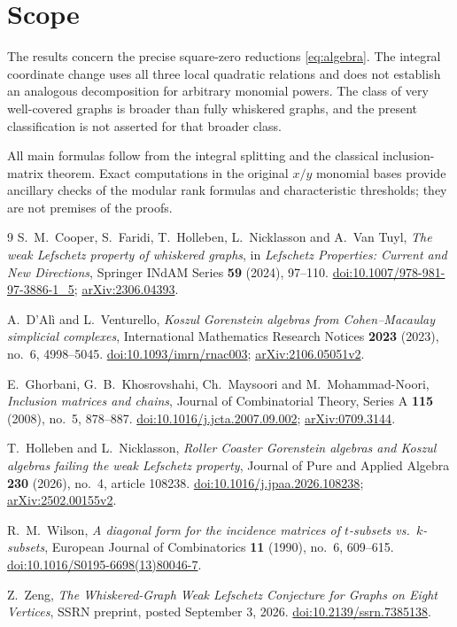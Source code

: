 \documentclass[11pt]{article}
\theoremstyle{remark}
\begin{document}
\section{Scope}
The results concern the precise square-zero reductions \eqref{eq:algebra}. The integral coordinate change uses all three local quadratic relations and does not establish an analogous decomposition for arbitrary monomial powers. The class of very well-covered graphs is broader than fully whiskered graphs, and the present classification is not asserted for that broader class.

All main formulas follow from the integral splitting and the classical inclusion-matrix theorem. Exact computations in the original $x/y$ monomial bases provide ancillary checks of the modular rank formulas and characteristic thresholds; they are not premises of the proofs.

\begin{thebibliography}{9}
S.~M.~Cooper, S.~Faridi, T.~Holleben, L.~Nicklasson and A.~Van Tuyl,
\emph{The weak Lefschetz property of whiskered graphs},
in \emph{Lefschetz Properties: Current and New Directions}, Springer INdAM Series \textbf{59} (2024), 97--110.
\href{https://doi.org/10.1007/978-981-97-3886-1_5}{doi:10.1007/978-981-97-3886-1\_5};
\href{https://arxiv.org/abs/2306.04393}{arXiv:2306.04393}.

A.~D'Al\`i and L.~Venturello,
\emph{Koszul Gorenstein algebras from Cohen--Macaulay simplicial complexes},
International Mathematics Research Notices \textbf{2023} (2023), no.~6, 4998--5045.
\href{https://doi.org/10.1093/imrn/rnac003}{doi:10.1093/imrn/rnac003};
\href{https://arxiv.org/abs/2106.05051v2}{arXiv:2106.05051v2}.

E.~Ghorbani, G.~B.~Khosrovshahi, Ch.~Maysoori and M.~Mohammad-Noori,
\emph{Inclusion matrices and chains},
Journal of Combinatorial Theory, Series A \textbf{115} (2008), no.~5, 878--887.
\href{https://doi.org/10.1016/j.jcta.2007.09.002}{doi:10.1016/j.jcta.2007.09.002};
\href{https://arxiv.org/abs/0709.3144}{arXiv:0709.3144}.

T.~Holleben and L.~Nicklasson,
\emph{Roller Coaster Gorenstein algebras and Koszul algebras failing the weak Lefschetz property},
Journal of Pure and Applied Algebra \textbf{230} (2026), no.~4, article 108238.
\href{https://doi.org/10.1016/j.jpaa.2026.108238}{doi:10.1016/j.jpaa.2026.108238};
\href{https://arxiv.org/abs/2502.00155v2}{arXiv:2502.00155v2}.

R.~M.~Wilson,
\emph{A diagonal form for the incidence matrices of $t$-subsets vs.~$k$-subsets},
European Journal of Combinatorics \textbf{11} (1990), no.~6, 609--615.
\href{https://doi.org/10.1016/S0195-6698(13)80046-7}{doi:10.1016/S0195-6698(13)80046-7}.

Z.~Zeng,
\emph{The Whiskered-Graph Weak Lefschetz Conjecture for Graphs on Eight Vertices},
SSRN preprint, posted September 3, 2026.
\href{https://doi.org/10.2139/ssrn.7385138}{doi:10.2139/ssrn.7385138}.
\end{thebibliography}
\end{document}
